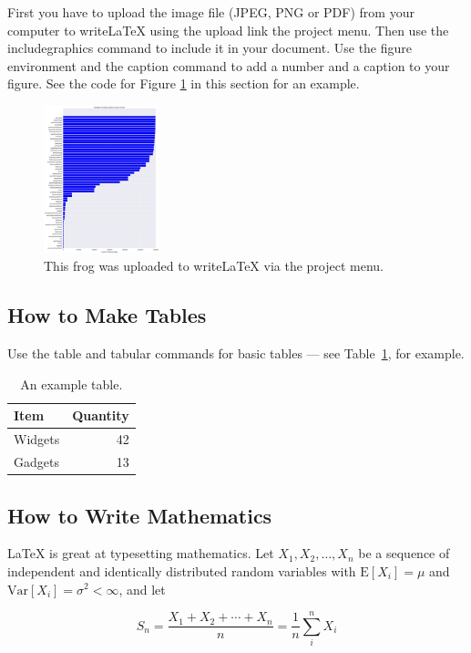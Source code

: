 \documentclass[a4paper]{article}
\begin{document}
First you have to upload the image file (JPEG, PNG or PDF) from your computer to writeLaTeX using the upload link the project menu. Then use the includegraphics command to include it in your document. Use the figure environment and the caption command to add a number and a caption to your figure. See the code for Figure \ref{fig:frog} in this section for an example.

\begin{figure}
\centering
\includegraphics[width=0.3\textwidth]{./img/prop-nan.png}
\caption{\label{fig:frog}This frog was uploaded to writeLaTeX via the project menu.}
\end{figure}

\subsection{How to Make Tables}

Use the table and tabular commands for basic tables --- see Table~\ref{tab:widgets}, for example.

\begin{table}
\centering
\begin{tabular}{l|r}
Item & Quantity \\\hline
Widgets & 42 \\
Gadgets & 13
\end{tabular}
\caption{\label{tab:widgets}An example table.}
\end{table}

\subsection{How to Write Mathematics}

\LaTeX{} is great at typesetting mathematics. Let $X_1, X_2, \ldots, X_n$ be a sequence of independent and identically distributed random variables with $\text{E}[X_i] = \mu$ and $\text{Var}[X_i] = \sigma^2 < \infty$, and let

\begin{equation}
S_n = \frac{X_1 + X_2 + \cdots + X_n}{n}
      = \frac{1}{n}\sum_{i}^{n} X_i
\label{eq:sn}
\end{equation}
\end{document}
